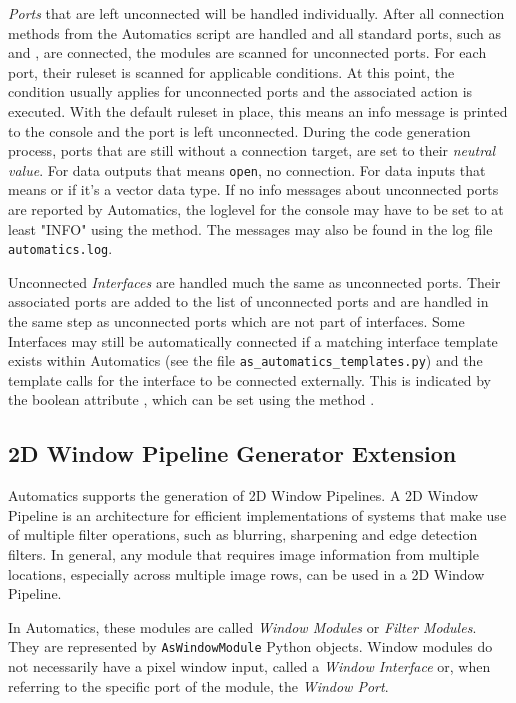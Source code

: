 \textit{Ports} that are left unconnected will be handled individually.
After all connection methods from the Automatics script are handled and all standard ports, such as  and , are connected, the modules are scanned for unconnected ports.
For each port, their ruleset is scanned for applicable conditions.
At this point, the  condition usually applies for unconnected ports and the associated action is executed.
With the default ruleset in place, this means an info message is printed to the console and the port is left unconnected.
During the code generation process, ports that are still without a connection target, are set to their \textit{neutral value}.
For data outputs that means \texttt{open}, no connection.
For data inputs that means  or  if it's a vector data type.
If no info messages about unconnected ports are reported by Automatics, the loglevel for the console may have to be set to at least "INFO" using the  method.
The messages may also be found in the log file \texttt{automatics.log}.

Unconnected \textit{Interfaces} are handled much the same as unconnected ports.
Their associated ports are added to the list of unconnected ports and are handled in the same step as unconnected ports which are not part of interfaces.
Some Interfaces may still be automatically connected if a matching interface template exists within Automatics (see the file \texttt{as\_automatics\_templates.py}) and the template calls for the interface to be connected externally.
This is indicated by the boolean attribute , which can be set using the method .


\subsection{2D Window Pipeline Generator Extension}
\label{sec:06-02-2dpipe_general}

Automatics supports the generation of 2D Window Pipelines.
A 2D Window Pipeline is an architecture for efficient implementations of systems that make use of multiple filter operations, such as blurring, sharpening and edge detection filters.
In general, any module that requires image information from multiple locations, especially across multiple image rows, can be used in a 2D Window Pipeline.

In Automatics, these modules are called \textit{Window Modules} or \textit{Filter Modules}.
They are represented by \texttt{AsWindowModule} Python objects.
Window modules do not necessarily have a pixel window input, called a \textit{Window Interface} or, when referring to the specific port of the module, the \textit{Window Port}.

